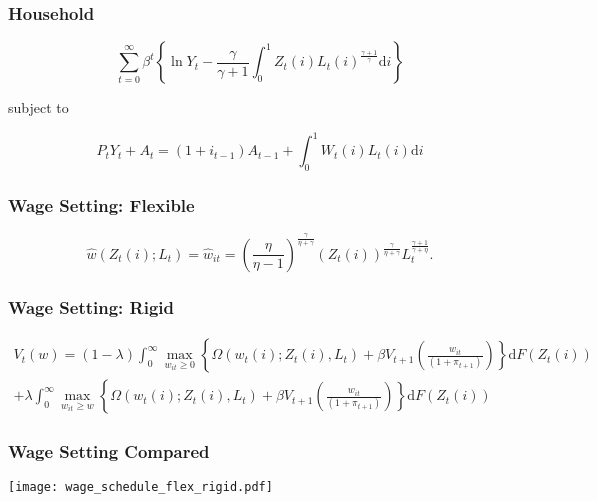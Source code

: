 \documentclass{beamer}
\begin{document}
\begin{frame}[t]\frametitle{Household}

    \begin{equation*} \label{eq:utility}
        \sum_{t=0}^{\infty} \beta^t \left\{\ln Y_t - \frac{\gamma}{\gamma + 1} \int_{0}^{1} Z_t(i)L_t(i)^{\frac{\gamma + 1}{\gamma}}\mathup{d}i\right\}
    \end{equation*}

    subject to

    \begin{equation*}
        \label{eq:budget}
        P_t Y_t + A_t = \left(1 + i_{t-1}\right)A_{t-1} + \int_{0}^{1}\! W_t(i)L_t(i)\mathup{d}i
    \end{equation*}

\end{frame}


\begin{frame}[t]\frametitle{Wage Setting: Flexible}

    \begin{equation*}
        \label{eq:flex}
        \hat{w}(Z_t(i); L_t) = \hat{w}_{it} = \left( \frac{\eta}{\eta - 1} \right)^{\frac{\gamma}{\eta + \gamma}}\left( Z_t(i) \right)^{\frac{\gamma}{\eta + \gamma}} L_t^{\frac{\gamma + 1}{\gamma + \eta}}.
    \end{equation*}


\end{frame}



\begin{frame}[t]\frametitle{Wage Setting: Rigid}

    \begin{multline}
        \label{eq:value_function}
        V_t(w) = (1 - \lambda) \int_{0}^{\infty} \max_{w_{it} \geq 0} \left\{ \Omega( w_t(i); Z_t(i), L_t ) + \beta V_{t+1}\left( \frac{w_{it}}{(1 + \pi_{t+1})} \right) \right\} \mathup{d}F(Z_t(i)) \\
                    + \lambda  \int_{0}^{\infty} \max_{w_{it} \geq w} \left\{ \Omega( w_t(i); Z_t(i), L_t ) + \beta V_{t+1}\left( \frac{w_{it}}{(1 + \pi_{t+1})} \right) \right\} \mathup{d}F(Z_t(i))
    \end{multline}


\end{frame}

\begin{frame}[t]\frametitle{Wage Setting Compared}

    \begin{center}
      \noindent \texttt{[image: wage\_schedule\_flex\_rigid.pdf]}
      \label{fig:wage_schedules}
    \end{center}

\end{frame}
\end{document}
